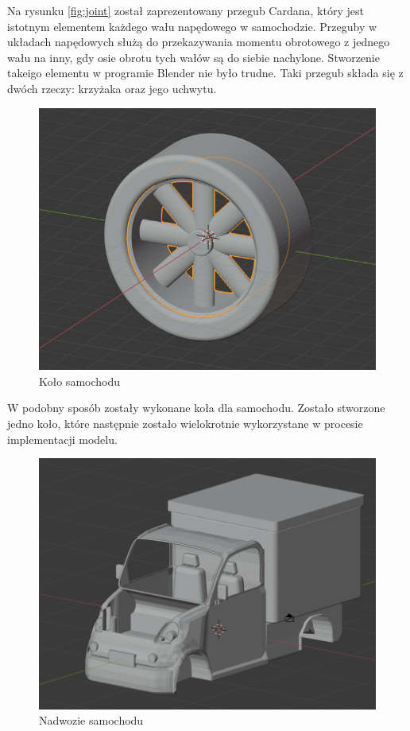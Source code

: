\documentclass[a4paper,12pt]{article}
\numberwithin{equation}{section}
\begin{document}
 Na rysunku \ref{fig:joint} został zaprezentowany przegub Cardana, który jest istotnym elementem każdego wału napędowego w samochodzie. Przeguby w układach napędowych służą do przekazywania momentu obrotowego z jednego wału na inny, gdy osie obrotu tych wałów są do siebie nachylone. Stworzenie takeigo elementu w programie Blender nie było trudne. Taki przegub składa się z dwóch rzeczy: krzyżaka oraz jego uchwytu.

\begin{figure}[H]
    \centering
    \includegraphics[width=\textwidth]{kolo.png}
    \caption{Koło samochodu}
    \label{fig:kolo}
\end{figure}
 
 W podobny sposób zostały wykonane koła dla samochodu. Zostało stworzone jedno koło, które następnie zostało wielokrotnie wykorzystane w procesie implementacji modelu. 

 \begin{figure}[h!]
    \centering
    \includegraphics[width=\textwidth]{nadwozie.png}
    \caption{Nadwozie samochodu}
    \label{fig:nadwozie}
\end{figure}
\end{document}
